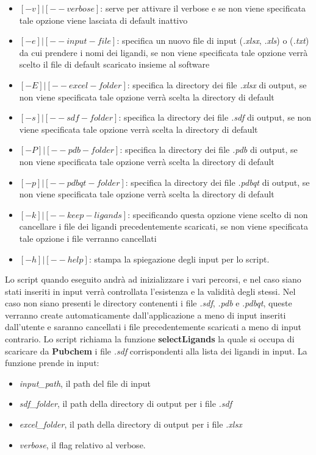 \begin{itemize}
    \item $[-v] | [--verbose]$: serve per attivare il verbose e se non viene specificata tale opzione viene lasciata di default inattivo
    \item $[-e] | [--input-file]$: specifica un nuovo file di input (\textit{.xlsx}, \textit{.xls}) o (\textit{.txt}) da cui prendere i nomi dei ligandi, se non viene specificata tale opzione verrà scelto il file di default scaricato insieme al software
    \item $[-E] | [--excel-folder]$: specifica la directory dei file \textit{.xlsx} di output, se non viene specificata tale opzione verrà scelta la directory di default
    \item $[-s] | [--sdf-folder]$: specifica la directory dei file \textit{.sdf} di output, se non viene specificata tale opzione verrà scelta la directory di default
    \item $[-P] | [--pdb-folder]$: specifica la directory dei file \textit{.pdb} di output, se non viene specificata tale opzione verrà scelta la directory di default
    \item $[-p] | [--pdbqt-folder]$: specifica la directory dei file \textit{.pdbqt} di output, se non viene specificata tale opzione verrà scelta la directory di default
    \item $[-k] | [--keep-ligands]$: specificando questa opzione viene scelto di non cancellare i file dei ligandi precedentemente scaricati, se non viene specificata tale opzione i file verranno cancellati
    \item $[-h] | [--help]$: stampa la spiegazione degli input per lo script.
\end{itemize}

Lo script quando eseguito andrà ad inizializzare i vari percorsi, e nel caso siano stati inseriti in input verrà controllata l'esistenza e la validità degli stessi. Nel caso non siano presenti le directory contenenti i file \textit{.sdf}, \textit{.pdb} e .\textit{pdbqt}, queste verranno create automaticamente dall'applicazione a meno di input inseriti dall'utente e saranno cancellati i file precedentemente scaricati a meno di input contrario.\newline
Lo script richiama la funzione \textbf{selectLigands} la quale si occupa di scaricare da \textbf{Pubchem}
i file \textit{.sdf} corrispondenti alla lista dei ligandi in input. La funzione prende in input: 

\begin{itemize}
    \item \textit{input\_path}, il path del file di input
    \item \textit{sdf\_folder}, il path della directory di output per i file \textit{.sdf}
    \item \textit{excel\_folder}, il path della directory di output per i file \textit{.xlsx}
    \item \textit{verbose}, il flag relativo al verbose.
\end{itemize}

